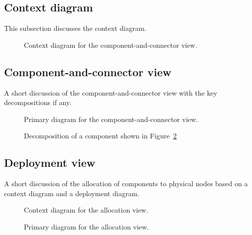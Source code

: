 \documentclass[a4paper,10pt]{article}
\begin{document}
\subsection{Context diagram}
This subsection discusses the context diagram.

\begin{figure}[!htp]
    \centering
    \caption{Context diagram for the component-and-connector view.
        }\label{fig:cc_context}
\end{figure}

\subsection{Component-and-connector view}
A short discussion of the component-and-connector view with the key
decompositions if any.

\begin{figure}[!htp]
    \centering
    \caption{Primary diagram for the component-and-connector view.
        }\label{fig:cc_main}
\end{figure}

\begin{figure}[!htp]
    \centering
    \caption{Decomposition of a component shown in Figure~\ref{fig:cc_main}
        }\label{fig:decomp_decomp1}
\end{figure}

\subsection{Deployment view}
A short discussion of the allocation of components to physical nodes based on a
context diagram and a deployment diagram.

\begin{figure}[!htp]
    \centering
    \caption{Context diagram for the allocation view.}\label{fig:depl_context}
\end{figure}

\begin{figure}[!htp]
    \centering
    \caption{Primary diagram for the allocation view.}\label{fig:depl_main}
\end{figure}
\end{document}
